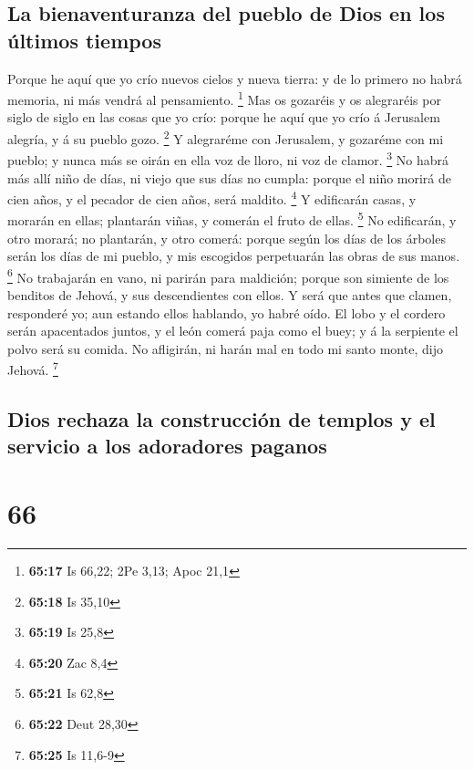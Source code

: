 \hypertarget{la-bienaventuranza-del-pueblo-de-dios-en-los-uxfaltimos-tiempos}{%
\subsection{La bienaventuranza del pueblo de Dios en los últimos
tiempos}\label{la-bienaventuranza-del-pueblo-de-dios-en-los-uxfaltimos-tiempos}}

 Porque he aquí que yo crío nuevos cielos y nueva tierra: y
de lo primero no habrá memoria, ni más vendrá al pensamiento.
\footnote{\textbf{65:17} Is 66,22; 2Pe 3,13; Apoc 21,1} 
Mas os gozaréis y os alegraréis por siglo de siglo en las cosas que yo
crío: porque he aquí que yo crío á Jerusalem alegría, y á su pueblo
gozo. \footnote{\textbf{65:18} Is 35,10}  Y alegraréme con
Jerusalem, y gozaréme con mi pueblo; y nunca más se oirán en ella voz de
lloro, ni voz de clamor. \footnote{\textbf{65:19} Is 25,8} 
No habrá más allí niño de días, ni viejo que sus días no cumpla: porque
el niño morirá de cien años, y el pecador de cien años, será maldito.
\footnote{\textbf{65:20} Zac 8,4}  Y edificarán casas, y
morarán en ellas; plantarán viñas, y comerán el fruto de ellas.
\footnote{\textbf{65:21} Is 62,8}  No edificarán, y otro
morará; no plantarán, y otro comerá: porque según los días de los
árboles serán los días de mi pueblo, y mis escogidos perpetuarán las
obras de sus manos. \footnote{\textbf{65:22} Deut 28,30} 
No trabajarán en vano, ni parirán para maldición; porque son simiente de
los benditos de Jehová, y sus descendientes con ellos.  Y
será que antes que clamen, responderé yo; aun estando ellos hablando, yo
habré oído.  El lobo y el cordero serán apacentados juntos,
y el león comerá paja como el buey; y á la serpiente el polvo será su
comida. No afligirán, ni harán mal en todo mi santo monte, dijo Jehová.
\footnote{\textbf{65:25} Is 11,6-9}

\hypertarget{dios-rechaza-la-construcciuxf3n-de-templos-y-el-servicio-a-los-adoradores-paganos}{%
\subsection{Dios rechaza la construcción de templos y el servicio a los
adoradores
paganos}\label{dios-rechaza-la-construcciuxf3n-de-templos-y-el-servicio-a-los-adoradores-paganos}}

\hypertarget{section-65}{%
\section{66}\label{section-65}}

